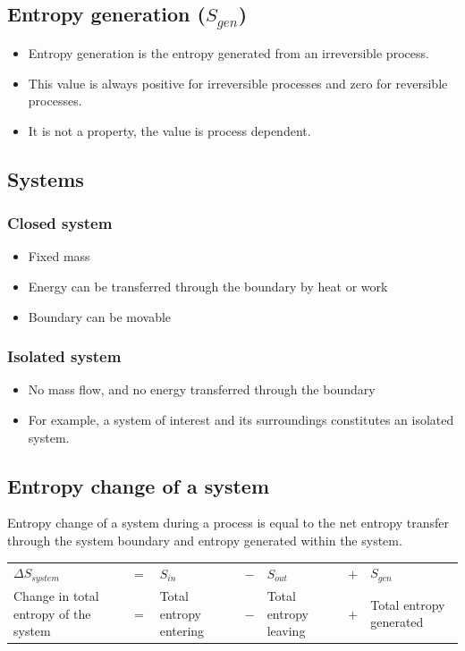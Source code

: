 \documentclass[11pt]{article}
\begin{document}
\subsection{Entropy generation (\(S_{gen}\))}
\label{sec:org1e735e8}
\begin{itemize}
\item Entropy generation is the entropy generated from an irreversible process.
\item This value is always positive for irreversible processes and zero for reversible processes.
\item It is not a property, the value is process dependent.
\end{itemize}
\subsection{Systems}
\label{sec:org947389f}

\subsubsection{Closed system}
\label{sec:orgb0c90f9}
\begin{itemize}
\item Fixed mass
\item Energy can be transferred through the boundary by heat or work
\item Boundary can be movable
\end{itemize}
\subsubsection{Isolated system}
\label{sec:orgfedca00}
\begin{itemize}
\item No mass flow, and no energy transferred through the boundary
\item For example, a system of interest and its surroundings constitutes an isolated system.
\end{itemize}
\subsection{Entropy change of a system}
\label{sec:orgf80ae00}
Entropy change of a system during a process is equal to the net entropy transfer through the system boundary and entropy generated within the system.


\begin{tabular}{ >{\centering\arraybackslash}m{6em} >{\centering\arraybackslash}m{1em} >{\centering\arraybackslash}m{6em} >{\centering\arraybackslash}m{1em} >{\centering\arraybackslash}m{6em} >{\centering\arraybackslash}m{1em} >{\centering\arraybackslash}m{6em} }
\(\Delta S_{system}\) & \(=\) & \(S_{in}\) & \(-\) & \(S_{out}\) & \(+\) & \(S_{gen}\) \\
Change in total entropy of the system & \(=\) & Total entropy entering & \(-\) & Total entropy leaving & \(+\) & Total entropy generated \\
\end{tabular}
\end{document}
